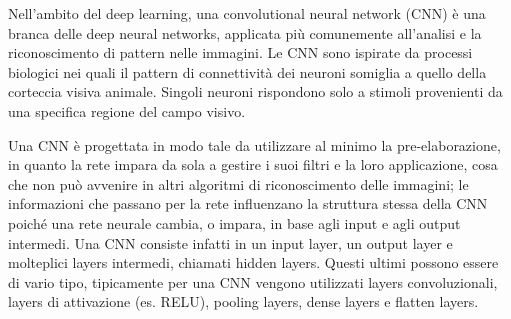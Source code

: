 Nell’ambito del deep learning, una convolutional neural network (CNN) è una branca delle deep neural networks, applicata più comunemente all’analisi e la riconoscimento di pattern nelle immagini. Le CNN sono ispirate da processi biologici nei quali il pattern di connettività dei neuroni somiglia a quello della corteccia visiva animale. Singoli neuroni rispondono solo a stimoli provenienti da una specifica regione del campo visivo. 

Una CNN è progettata in modo tale da utilizzare al minimo la pre-elaborazione, in quanto la rete impara da sola a gestire i suoi filtri e la loro applicazione, cosa che non può avvenire in altri algoritmi di riconoscimento delle immagini; le informazioni che passano per la rete influenzano la struttura stessa della CNN poiché una rete neurale cambia, o impara, in base agli input e agli output intermedi. Una CNN consiste infatti in un input layer, un output layer e molteplici layers intermedi, chiamati hidden layers. Questi ultimi possono essere di vario tipo, tipicamente per una CNN vengono utilizzati layers convoluzionali, layers di attivazione (es. RELU), pooling layers, dense layers e flatten layers. 
